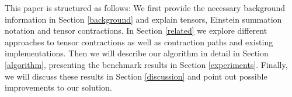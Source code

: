  \noindent This paper is structured as follows: We first provide the necessary background information in Section \ref{background} and explain tensors, Einstein summation notation and tensor contractions. In Section \ref{related} we explore different approaches to tensor contractions as well as contraction paths and existing implementations. Then we will describe our algorithm in detail in Section \ref{algorithm}, presenting the benchmark results in Section \ref{experiments}. Finally, we will discuss these results in Section \ref{discussion} and point out possible improvements to our solution.
